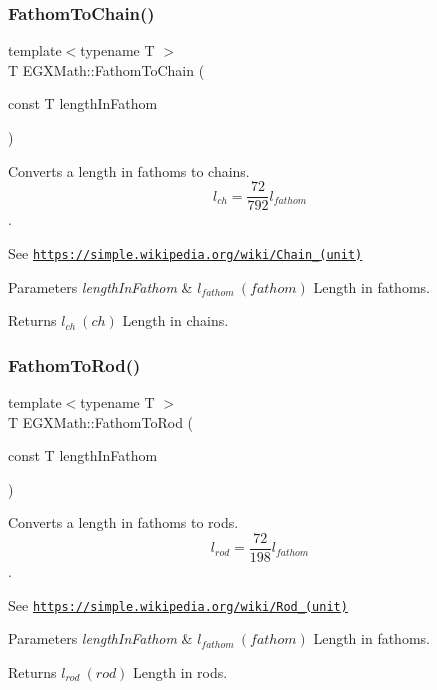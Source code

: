 \subsubsection{\texorpdfstring{Fathom\+To\+Chain()}{FathomToChain()}}
{\footnotesize\ttfamily template$<$typename T $>$ \\
T E\+G\+X\+Math\+::\+Fathom\+To\+Chain (\begin{DoxyParamCaption}\item[{const T}]{length\+In\+Fathom }\end{DoxyParamCaption})}



Converts a length in fathoms to chains. \[ l_{ch}= \frac{72}{792} l_{fathom} \]. 

See \href{https://simple.wikipedia.org/wiki/Chain_(unit)}{\tt https\+://simple.\+wikipedia.\+org/wiki/\+Chain\+\_\+(unit)} 
\begin{DoxyParams}{Parameters}
{\em length\+In\+Fathom} & $ l_{fathom}\ (fathom)$ Length in fathoms. \\
\hline
\end{DoxyParams}
\begin{DoxyReturn}{Returns}
$ l_{ch}\ (ch)$ Length in chains. 
\end{DoxyReturn}
\mbox{\label{group___e_g_x_math-_conversions-_length_conversions-_imperial-_fathom-_surveyors_ga6afd3032ea722bf44ba979d3e37a2dc2}} 
\subsubsection{\texorpdfstring{Fathom\+To\+Rod()}{FathomToRod()}}
{\footnotesize\ttfamily template$<$typename T $>$ \\
T E\+G\+X\+Math\+::\+Fathom\+To\+Rod (\begin{DoxyParamCaption}\item[{const T}]{length\+In\+Fathom }\end{DoxyParamCaption})}



Converts a length in fathoms to rods. \[ l_{rod}= \frac{72}{198} l_{fathom} \]. 

See \href{https://simple.wikipedia.org/wiki/Rod_(unit)}{\tt https\+://simple.\+wikipedia.\+org/wiki/\+Rod\+\_\+(unit)} 
\begin{DoxyParams}{Parameters}
{\em length\+In\+Fathom} & $ l_{fathom}\ (fathom)$ Length in fathoms. \\
\hline
\end{DoxyParams}
\begin{DoxyReturn}{Returns}
$ l_{rod}\ (rod)$ Length in rods. 
\end{DoxyReturn}
